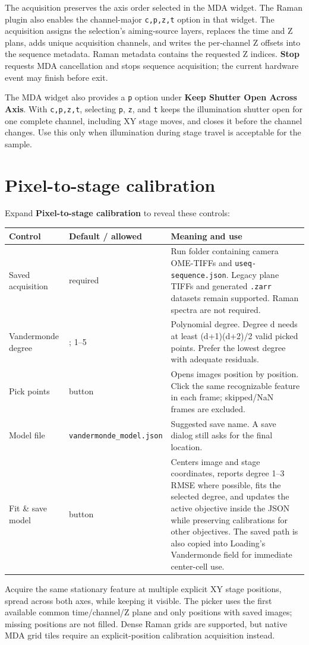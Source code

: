 \documentclass[11pt,oneside]{report}
\makeatletter
\newcommand{\ui}[1]{\textbf{#1}}
\newcommand{\code}[1]{\texttt{#1}}
\newcommand{\fieldtable}{\begin{longtable}{@{}>{\raggedright\arraybackslash}p{0.25\textwidth}>{\raggedright\arraybackslash}p{0.18\textwidth}>{\raggedright\arraybackslash}p{0.50\textwidth}@{}}\toprule\textbf{Control} & \textbf{Default / allowed} & \textbf{Meaning and use}\\\midrule\endhead}
\newcommand{\endfieldtable}{\bottomrule\end{longtable}}
\makeatother
\begin{document}
The acquisition preserves the axis order selected in the MDA widget. The Raman
plugin also enables the channel-major \code{c,p,z,t} option in that widget. The
acquisition assigns the selection's aiming-source layers, replaces the time and
Z plans, adds unique acquisition channels, and writes
the per-channel Z offsets into the sequence metadata. Raman metadata contains the
requested Z indices. \ui{Stop} requests MDA cancellation and stops sequence
acquisition; the current hardware event may finish before exit.

The MDA widget also provides a \code{p} option under \ui{Keep Shutter Open Across
Axis}. With \code{c,p,z,t}, selecting \code{p}, \code{z}, and \code{t} keeps the
illumination shutter open for one complete channel, including XY stage moves, and
closes it before the channel changes. Use this only when illumination during stage
travel is acceptable for the sample.

\section{Pixel-to-stage calibration}
Expand \ui{Pixel-to-stage calibration} to reveal these controls:
\fieldtable
Saved acquisition & required & Run folder containing camera OME-TIFFs and
\code{useq-sequence.json}. Legacy plane TIFFs and generated \code{.zarr}
datasets remain supported. Raman spectra are not required.\\
Vandermonde degree & 1; 1--5 & Polynomial degree. Degree d needs at least
(d+1)(d+2)/2 valid picked points. Prefer the lowest degree with adequate residuals.\\
Pick points & button & Opens images position by position. Click the same recognizable
feature in each frame; skipped/NaN frames are excluded.\\
Model file & \code{vandermonde\_model.json} & Suggested save name. A save dialog still
asks for the final location.\\
Fit \& save model & button & Centers image and stage coordinates, reports degree 1--3
RMSE where possible, fits the selected degree, and updates the active objective
inside the JSON while preserving calibrations for other objectives. The saved path
is also copied into Loading's Vandermonde field for immediate center-cell use.\\
\endfieldtable

Acquire the same stationary feature at multiple explicit XY stage positions,
spread across both axes, while keeping it visible. The picker uses the first
available common time/channel/Z plane and only positions with saved images;
missing positions are not filled. Dense Raman grids are supported, but native
MDA grid tiles require an explicit-position calibration acquisition instead.
\end{document}
